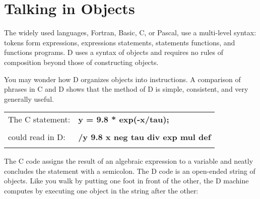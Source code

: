 \section{Talking in Objects}

The widely used languages,  Fortran,  Basic,  C, or Pascal, use a multi-level syntax: tokens form expressions, expressions statements, statements functions,  and  functions  programs.  D  uses a syntax  of  objects  and requires no rules of composition beyond those of constructing objects.

You may wonder how D organizes objects into instructions.  A comparison of phrases  in  C and D shows that the  method  of  D  is  simple, consistent, and very generally useful.\\

\begin{tabular}{>{\normalfont}l>{\sffamily\bfseries}l}
The C statement:  & y = 9.8 * exp(-x/tau);\\\\
could read in D:  & /y 9.8 x neg tau div exp mul def\\\\
\end{tabular}

\noindent The  C code assigns the result of an algebraic expression to a variable and neatly concludes the statement with a semicolon.  The D code is an open-ended  string of objects.  Like you walk by putting one foot in front of the other,  the D machine computes by executing one object in the  string after the other:\\

